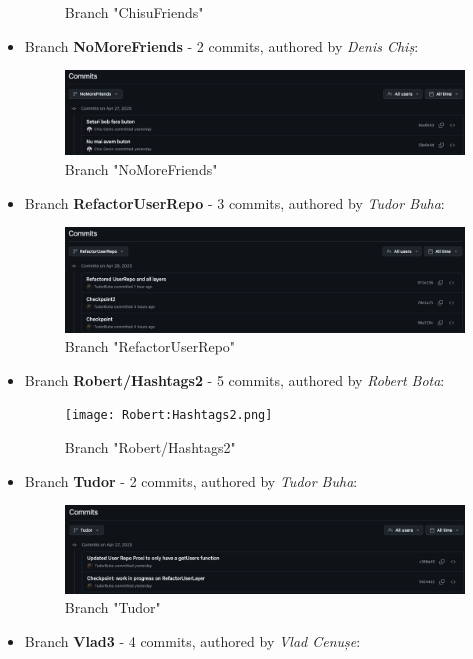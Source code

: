 \documentclass[9pt,a4paper,twocolumn,twoside]{tau-class/tau}
\begin{document}
\begin{itemize}
\begin{figure}[H]
    \centering
    \caption{Branch "ChisuFriends"}
    \end{figure}
    \item Branch \textbf{NoMoreFriends} - 2 commits, authored by \textit{Denis Chiș}:
    \begin{figure}[H]
    \includegraphics[width=0.9\columnwidth]{NoMoreFriends.png}
    \centering
    \caption{Branch "NoMoreFriends"}
    \end{figure}
    \item Branch \textbf{RefactorUserRepo} - 3 commits, authored by \textit{Tudor Buha}:
    \begin{figure}[H]
    \includegraphics[width=0.9\columnwidth]{RefactorUserRepo.png}
    \centering
    \caption{Branch "RefactorUserRepo"}
    \end{figure}
    \item Branch \textbf{Robert/Hashtags2} - 5 commits, authored by \textit{Robert Bota}:
    \begin{figure}[H]
    \texttt{[image: Robert:Hashtags2.png]}
    \centering
    \caption{Branch "Robert/Hashtags2"}
    \end{figure}
    \item Branch \textbf{Tudor} - 2 commits, authored by \textit{Tudor Buha}:
    \begin{figure}[H]
    \includegraphics[width=0.9\columnwidth]{Tudor.png}
    \centering
    \caption{Branch "Tudor"}
    \end{figure}
    \item Branch \textbf{Vlad3} - 4 commits, authored by \textit{Vlad Cenușe}:
    \begin{figure}[H]

\end{figure}
\end{itemize}
\end{document}
